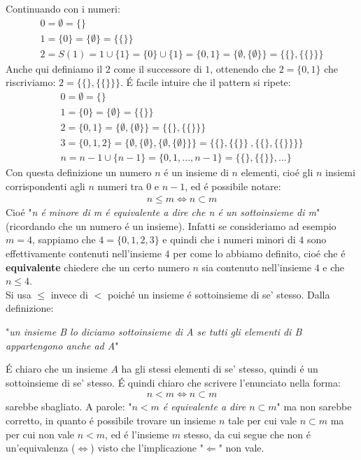 \documentclass[twoside]{article} %
\begin{document}
	 Continuando con i numeri:
	 \begin{gather*}
	 	0=\emptyset=\{\}\\
	 	1=\{0\}=\{\emptyset\}=\{\{\}\}\\
	 	2=S(1)=1\cup \{1\}=\{0\}\cup \{1\}=\{0, 1\}=\{\emptyset, \{\emptyset\}\}=\{\{\}, \{\{\}\}\} 
	 \end{gather*}
	 Anche qui definiamo il $2$ come il successore di $1$, ottenendo che $2=\{0,1\}$ che riscriviamo: $2=\{\{\}, \{\{\}\}\} $.
	 \newpage 
	 \noindent \'E facile intuire che il pattern si ripete:
	 \begin{gather*}
	 	0=\emptyset=\{\}\\
	 	1=\{0\}=\{\emptyset\}=\{\{\}\}\\
	 	2=\{0, 1\}=\{\emptyset, \{\emptyset\}\}=\{\{\}, \{\{\}\}\}\\
	 	3=\{0, 1, 2\}= \{\emptyset, \{\emptyset\}, \{\emptyset, \{\emptyset\}\}\}=\{\{\}, \{\{\}\}\ ,\{\{\}, \{\{\}\}\}\}\\
	 	n=n-1\cup\{n-1\}=\{0,1, ..., n-1\}=\{\{\}, \{\{\}\}, ...\}
	 \end{gather*} 
	 Con questa definizione un numero $n$ \'e un insieme di $n$ elementi, cio\'e gli $n$ insiemi corrispondenti agli $n$ numeri tra $0$ e $n-1$, ed \'e possibile notare:
	 \begin{gather*}
	 	n\leq m\Leftrightarrow n\subset m
	 \end{gather*}
	 Cio\'e "\textit{n \'e minore di m \'e equivalente a dire che n \'e un sottoinsieme di m}" (ricordando che un numero \'e un insieme). Infatti se consideriamo ad esempio $m=4$, sappiamo che $4=\{0,1,2,3\}$ e quindi che i numeri minori di $4$  sono effettivamente contenuti nell'insieme $4$ per come lo abbiamo definito, cio\'e che \'e \textbf{equivalente} chiedere che un certo numero $n$ sia contenuto nell'insieme $4$ e che $n\leq 4$.\\
	 Si usa $\leq$ invece di $<$ poich\'e un insieme \'e sottoinsieme di se' stesso. Dalla definizione: 
	 \begin{center}
		"\textit{un insieme B lo diciamo sottoinsieme di A se tutti gli elementi di B appartengono anche ad A}"
	\end{center}
	\'E chiaro che un insieme $A$ ha gli stessi elementi di se' stesso, quindi \'e un sottoinsieme di se' stesso. \'E quindi chiaro che scrivere l'enunciato nella forma:
	\begin{gather*}
		n< m\Leftrightarrow n\subset m
	\end{gather*}
	sarebbe sbagliato. A parole: "\textit{$n<m$ \'e equivalente a dire $n\subset m$}" ma non sarebbe corretto, in quanto \'e possibile trovare un insieme $n$ tale per cui vale $n\subset m$ ma per cui non vale $n<m$, ed \'e l'insieme $m$ stesso, da cui segue che non \'e un'equivalenza ($\Leftrightarrow$) visto che l'implicazione "$\Leftarrow$" non vale.
	\newpage
\end{document}

